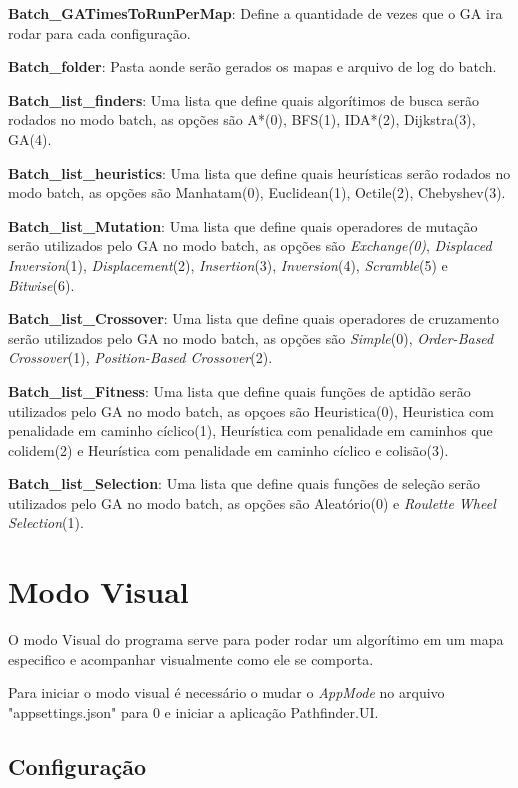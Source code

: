 \textbf{Batch\_GATimesToRunPerMap}: Define a quantidade de vezes que o GA ira rodar para cada configuração.

\textbf{Batch\_folder}: Pasta aonde serão gerados os mapas e arquivo de log do batch.

\textbf{Batch\_list\_finders}: Uma lista que define quais algorítimos de busca serão rodados no modo batch, as opções são  A\**(0), BFS(1), IDA\**(2), Dijkstra(3), GA(4).

\textbf{Batch\_list\_heuristics}: Uma lista que define quais heurísticas serão rodados no modo batch, as opções são Manhatam(0), Euclidean(1), Octile(2), Chebyshev(3).

\textbf{Batch\_list\_Mutation}: Uma lista que define quais operadores de mutação serão utilizados pelo GA no modo batch, as opções são  \textit{Exchange(0)}, \textit{Displaced Inversion}(1), \textit{Displacement}(2), \textit{Insertion}(3), \textit{Inversion}(4), \textit{Scramble}(5) e \textit{Bitwise}(6).

\textbf{Batch\_list\_Crossover}: Uma lista que define quais operadores de cruzamento serão utilizados pelo GA no modo batch, as opções são  \textit{Simple}(0), \textit{Order-Based Crossover}(1), \textit{Position-Based Crossover}(2).

\textbf{Batch\_list\_Fitness}: Uma lista que define quais funções de aptidão serão utilizados pelo GA no modo batch, as opçoes são Heuristica(0), Heuristica com penalidade em caminho cíclico(1), Heurística com penalidade em caminhos que colidem(2) e Heurística com penalidade em caminho cíclico e colisão(3).

\textbf{Batch\_list\_Selection}: Uma lista que define quais funções de seleção serão utilizados pelo GA no modo batch, as opções são  Aleatório(0) e \textit{Roulette Wheel Selection}(1).

\section{Modo Visual}

O modo Visual do programa serve para poder rodar um algorítimo em um mapa especifico e acompanhar visualmente como ele se comporta.

Para iniciar o modo visual é necessário o mudar o \textit{AppMode} no arquivo "appsettings.json" para 0 e iniciar a aplicação Pathfinder.UI.


\subsection{Configuração}



